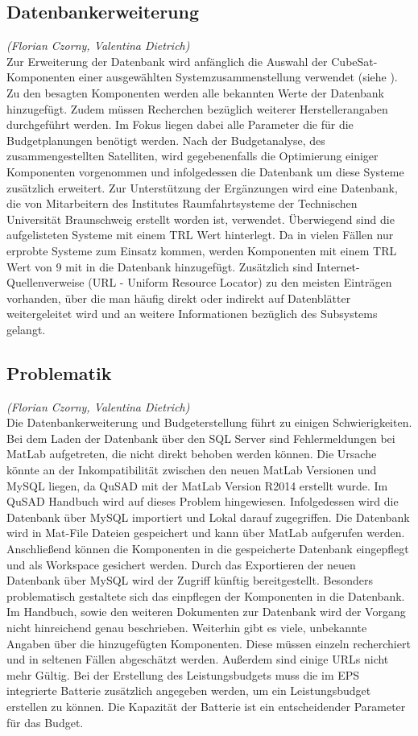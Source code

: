			\subsection{Datenbankerweiterung}
			\hfill\emph{(Florian Czorny, Valentina Dietrich)}\\
Zur Erweiterung der Datenbank wird anfänglich die Auswahl der CubeSat-Komponenten einer ausgewählten Systemzusammenstellung verwendet (siehe ). Zu den besagten Komponenten werden alle bekannten Werte der Datenbank hinzugefügt. Zudem müssen Recherchen bezüglich weiterer Herstellerangaben durchgeführt werden. Im Fokus liegen dabei alle Parameter die für die Budgetplanungen benötigt werden. Nach der Budgetanalyse, des zusammengestellten Satelliten, wird gegebenenfalls die Optimierung einiger Komponenten vorgenommen und infolgedessen die Datenbank um diese Systeme zusätzlich erweitert. Zur Unterstützung der Ergänzungen wird eine  Datenbank, die von Mitarbeitern des Institutes Raumfahrtsysteme der Technischen Universität Braunschweig erstellt worden ist, verwendet. Überwiegend sind die aufgelisteten Systeme mit einem TRL Wert hinterlegt. Da in vielen Fällen nur erprobte Systeme zum Einsatz kommen, werden Komponenten mit einem TRL Wert von \num{9} mit in die Datenbank hinzugefügt. Zusätzlich sind Internet-Quellenverweise (URL - Uniform Resource Locator) zu den meisten Einträgen vorhanden, über die man häufig direkt oder indirekt auf Datenblätter weitergeleitet wird und an weitere Informationen bezüglich des Subsystems gelangt.
			
			\subsection{Problematik}
			\hfill\emph{(Florian Czorny, Valentina Dietrich)}\\
Die Datenbankerweiterung und Budgeterstellung führt zu einigen Schwierigkeiten. Bei dem Laden der Datenbank über den SQL Server sind Fehlermeldungen bei MatLab aufgetreten, die nicht direkt behoben werden können. Die Ursache könnte an der Inkompatibilität zwischen den neuen MatLab Versionen und MySQL liegen, da QuSAD mit der MatLab Version R2014 erstellt wurde. Im QuSAD Handbuch wird auf dieses Problem hingewiesen. Infolgedessen wird die Datenbank über MySQL importiert und Lokal darauf zugegriffen. Die Datenbank wird in Mat-File Dateien gespeichert und kann über MatLab aufgerufen werden. Anschließend können die Komponenten in die gespeicherte Datenbank eingepflegt und als Workspace gesichert werden. Durch das Exportieren der neuen Datenbank über MySQL wird der Zugriff künftig bereitgestellt. Besonders problematisch gestaltete sich das einpflegen der Komponenten in die Datenbank. Im Handbuch, sowie den weiteren Dokumenten zur Datenbank wird der Vorgang nicht hinreichend genau beschrieben. Weiterhin gibt es viele, unbekannte Angaben über die hinzugefügten Komponenten. Diese müssen einzeln recherchiert und in seltenen Fällen abgeschätzt werden. Außerdem sind einige URLs nicht mehr Gültig. Bei der Erstellung des Leistungsbudgets muss die im EPS integrierte Batterie zusätzlich angegeben werden, um ein Leistungsbudget erstellen zu können. Die Kapazität der Batterie ist ein entscheidender Parameter für das Budget. 
		
